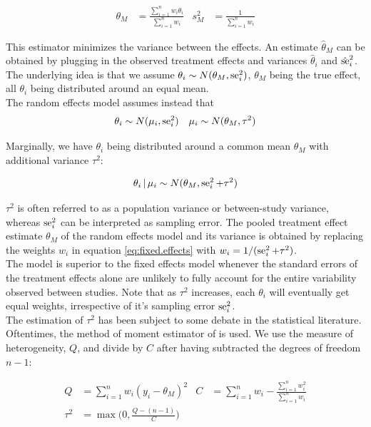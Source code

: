 \documentclass[11pt,a4paper,twoside]{book}\usepackage[]{graphicx}\usepackage[]{color}
\begin{document}
\begin{align}
\theta_M &= \frac{\sum_{i = 1}^n w_i \theta_i}{\sum_{i = 1}^n w_i} &
s_M^2 &= \frac{1}{\sum_{i = 1}^n w_i} \label{eq:fixed.effects}
\end{align}

This estimator minimizes the variance between the effects. An estimate $\hat{\theta}_M$ can be obtained by plugging in the observed treatment effects and variances $\hat{\theta}_i$ and $\hat{\operatorname{se}}_i^2$. The underlying idea is that we assume $\theta_i \sim N(\theta_M, \operatorname{se}_i^2)$, $\theta_M$ being the true effect, all $\theta_i$ being distributed around an equal mean. \\
The random effects model \citep{whitehead} assumes instead that 
\begin{align}
\theta_i \sim N(\mu_i, \operatorname{se}_i^2) &&
\mu_i \sim N(\theta_M, \tau^2) \label{eq:random.effects} 
\end{align}

Marginally, we have $\theta_i$ being distributed around a common mean $\theta_M$ with additional variance $\tau^2$:

\begin{align}
\theta_i \given \mu_i \sim N(\theta_M, \se_i^2 + \tau^2) \nonumber %
\end{align}

$\tau^2$ is often referred to as a population variance or between-study variance, whereas $\operatorname{se}_i^2$ can be interpreted as sampling error. The pooled treatment effect estimate $\theta_M$ of the random effects model and its variance is obtained by replacing the weights $w_i$ in equation \eqref{eq:fixed.effects} with $w_i = 1/(\operatorname{se}_i^2 + \tau^2)$. \\
The model is superior to the fixed effects model whenever the standard errors of the treatment effects alone are unlikely to fully account for the entire variability observed between studies. Note that as $\tau^2$ increases, each $\theta_i$ will eventually get equal weights, irrespective of it's sampling error $\operatorname{se}_i^2$.\\
The estimation of $\tau^2$ has been subject to some debate in the statistical literature. Oftentimes, the method of moment estimator of \citet{tau.estimator} is used.
We use the measure of heterogeneity, $Q$, and divide by $C$ after having subtracted the degrees of freedom $n-1$:

\begin{align}
Q &= \sum_{i = 1}^n w_i(y_i - \theta_M)^2 & C &= \sum_{i = 1}^n w_i - \frac{\sum_{i = 1}^n w_i^2}{\sum_{i = 1}^n w_i}\label{eq:Q.heterogeneity} \\
\tau^2 &= \max\big(0, \frac{Q - (n-1)}{C}\big) \label{eq:Tau.definition}
\end{align}
\end{document}
